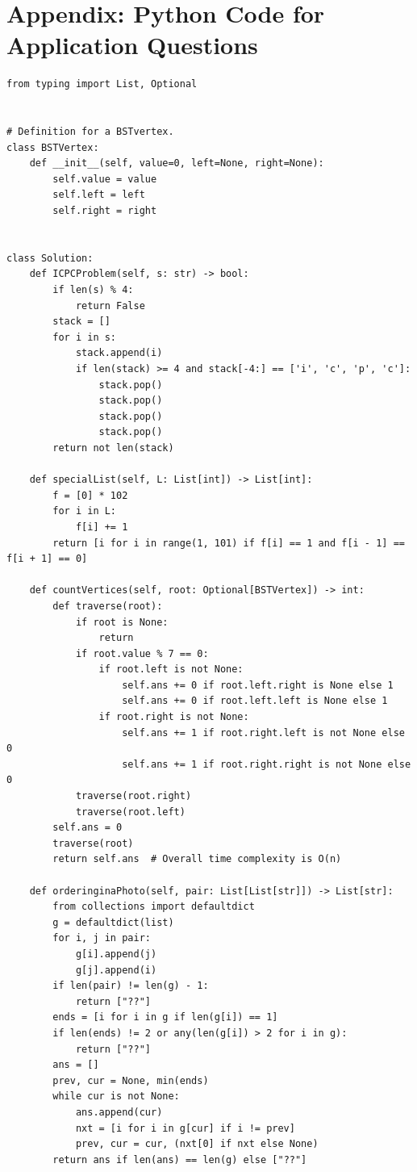 \documentclass[12pt]{article}
\begin{document}
\section*{Appendix: Python Code for Application Questions}
\begin{verbatim}
from typing import List, Optional


# Definition for a BSTvertex.
class BSTVertex:
    def __init__(self, value=0, left=None, right=None):
        self.value = value
        self.left = left
        self.right = right


class Solution:
    def ICPCProblem(self, s: str) -> bool:
        if len(s) % 4:
            return False
        stack = []
        for i in s:
            stack.append(i)
            if len(stack) >= 4 and stack[-4:] == ['i', 'c', 'p', 'c']:
                stack.pop()
                stack.pop()
                stack.pop()
                stack.pop()
        return not len(stack)

    def specialList(self, L: List[int]) -> List[int]:
        f = [0] * 102
        for i in L:
            f[i] += 1
        return [i for i in range(1, 101) if f[i] == 1 and f[i - 1] == f[i + 1] == 0]

    def countVertices(self, root: Optional[BSTVertex]) -> int:
        def traverse(root):
            if root is None:
                return
            if root.value % 7 == 0:
                if root.left is not None:
                    self.ans += 0 if root.left.right is None else 1
                    self.ans += 0 if root.left.left is None else 1
                if root.right is not None:
                    self.ans += 1 if root.right.left is not None else 0
                    self.ans += 1 if root.right.right is not None else 0
            traverse(root.right)
            traverse(root.left)
        self.ans = 0
        traverse(root)
        return self.ans  # Overall time complexity is O(n)

    def orderinginaPhoto(self, pair: List[List[str]]) -> List[str]:
        from collections import defaultdict
        g = defaultdict(list)
        for i, j in pair:
            g[i].append(j)
            g[j].append(i)
        if len(pair) != len(g) - 1:
            return ["??"]
        ends = [i for i in g if len(g[i]) == 1]
        if len(ends) != 2 or any(len(g[i]) > 2 for i in g):
            return ["??"]
        ans = []
        prev, cur = None, min(ends)
        while cur is not None:
            ans.append(cur)
            nxt = [i for i in g[cur] if i != prev]
            prev, cur = cur, (nxt[0] if nxt else None)
        return ans if len(ans) == len(g) else ["??"]


\end{verbatim}
\end{document}
